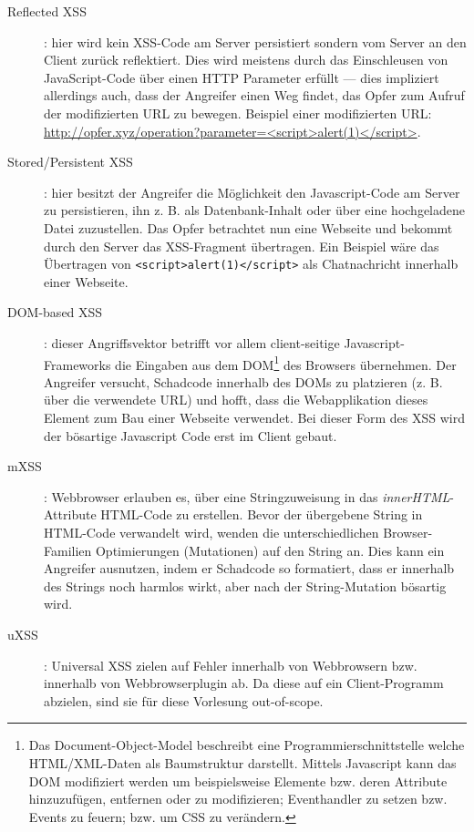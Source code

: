 \begin{description}
	\item[Reflected XSS]: hier wird kein XSS-Code am Server persistiert sondern vom Server an den Client zurück reflektiert. Dies wird meistens durch das Einschleusen von JavaScript-Code über einen HTTP Parameter erfüllt --- dies impliziert allerdings auch, dass der Angreifer einen Weg findet, das Opfer zum Aufruf der modifizierten URL zu bewegen. Beispiel einer modifizierten URL: \url{http://opfer.xyz/operation?parameter=<script>alert(1)</script>}.
	\item[Stored/Persistent XSS]: hier besitzt der Angreifer die Möglichkeit den Javascript-Code am Server zu persistieren, ihn z. B. als Datenbank-Inhalt oder über eine hochgeladene Datei zuzustellen. Das Opfer betrachtet nun eine Webseite und bekommt durch den Server das XSS-Fragment übertragen. Ein Beispiel wäre das Übertragen von \texttt{<script>alert(1)</script>} als Chatnachricht innerhalb einer Webseite.
	\item[DOM-based XSS]: dieser Angriffsvektor betrifft vor allem client-seitige Javascript-Frameworks die Eingaben aus dem DOM\footnote{Das Document-Object-Model beschreibt eine Programmierschnittstelle welche HTML/XML-Daten als Baumstruktur darstellt. Mittels Javascript kann das DOM modifiziert werden um beispielsweise Elemente bzw. deren Attribute hinzuzufügen, entfernen oder zu modifizieren; Eventhandler zu setzen bzw. Events zu feuern; bzw. um CSS zu verändern.} des Browsers übernehmen. Der Angreifer versucht, Schadcode innerhalb des DOMs zu platzieren (z. B. über die verwendete URL) und hofft, dass die Webapplikation dieses Element zum Bau einer Webseite verwendet. Bei dieser Form des XSS wird der bösartige Javascript Code erst im Client gebaut.
	\item[mXSS]: Webbrowser erlauben es, über eine Stringzuweisung in das \textit{innerHTML}-Attribute HTML-Code zu erstellen. Bevor der übergebene String in HTML-Code verwandelt wird, wenden die unterschiedlichen Browser-Familien Optimierungen (Mutationen) auf den String an. Dies kann ein Angreifer ausnutzen, indem er Schadcode so formatiert, dass er innerhalb des Strings noch harmlos wirkt, aber nach der String-Mutation bösartig wird.
	\item[uXSS]: Universal XSS zielen auf Fehler innerhalb von Webbrowsern bzw. innerhalb von Webbrowserplugin ab. Da diese auf ein Client-Programm abzielen, sind sie für diese Vorlesung out-of-scope.
\end{description}

